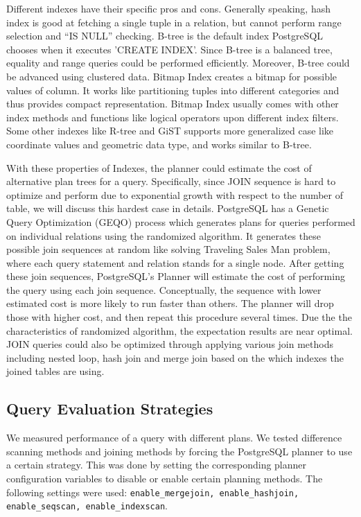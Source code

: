 \documentclass[a4paper]{article}
\begin{document}
Different indexes have their specific pros and cons. Generally speaking, hash index is good at fetching a single tuple in a relation, but cannot perform range selection and ``IS NULL'' checking. B-tree is the default index PostgreSQL chooses when it executes 'CREATE INDEX'. Since B-tree is a balanced tree, equality and range queries could be performed efficiently. Moreover, B-tree could be advanced using clustered data. Bitmap Index creates a bitmap for possible values of column. It works like partitioning tuples into different categories and thus provides compact representation. Bitmap Index usually comes with other index methods and functions like logical operators upon different index filters\cite{1}. Some other indexes like R-tree and GiST supports more generalized case like coordinate values and geometric data type, and works similar to B-tree.

With these properties of Indexes, the planner could estimate the cost of alternative plan trees for a query. Specifically, since JOIN sequence is hard to optimize and perform due to exponential growth with respect to the number of table, we will discuss this hardest case in details. PostgreSQL has a Genetic Query Optimization (GEQO) process which generates plans for queries performed on individual relations using the randomized algorithm\cite{1}. It generates these possible join sequences at random like solving Traveling Sales Man problem, where each query statement and relation stands for a single node. After getting these join sequences, PostgreSQL's Planner will estimate the cost of performing the query using each join sequence. Conceptually, the sequence with lower estimated cost is more likely to run faster than others. The planner will drop those with higher cost, and then repeat this procedure several times. Due the the characteristics of randomized algorithm, the expectation results are near optimal. JOIN queries could also be optimized through applying various join methods including nested loop, hash join and merge join based on the which indexes the joined tables are using.

\subsection{Query Evaluation Strategies}
We measured performance of a query with different plans. We tested difference scanning methods and joining methods by forcing the PostgreSQL planner to use a certain strategy. This was done by setting the corresponding planner configuration variables to disable or enable certain planning methods. The following settings were used: \texttt{enable\_mergejoin, enable\_hashjoin, enable\_seqscan, enable\_indexscan}.
\end{document}
